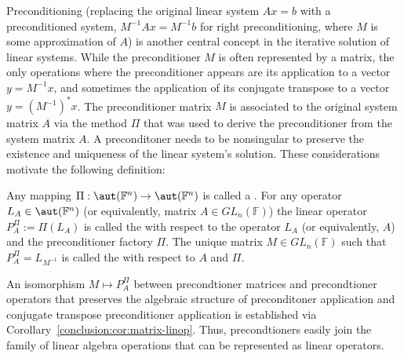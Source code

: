 Preconditioning (replacing the original linear system $Ax = b$ with a
preconditioned system, \eg $M^{-1}Ax = M^{-1}b$ for right preconditioning, where
$M$ is some approximation of $A$) is another central concept in the iterative
solution of linear systems. While the preconditioner $M$ is often
represented by a matrix, the only operations where the preconditioner appears
are its application to a vector $y = M^{-1}x$, and sometimes the application of
its conjugate transpose to a vector $y = (M^{-1})^*x$. The preconditioner matrix
$M$ is associated to the original system matrix $A$ via the method $\Pi$ that
was used to derive the preconditioner from the system matrix $A$. A
preconditoner needs to be nonsingular to preserve the existence and uniqueness
of the linear system's solution. These considerations motivate the following
definition:

\begin{definition}
\label{conclusion:def:precond-linop}
Any mapping $\Pi : \aut(\mathbb{F}^n) \rightarrow \aut(\mathbb{F}^n)$ is called
a . For any operator $L_A \in
\aut(\mathbb{F}^n)$ (or equivalently, matrix $A \in GL_n(\mathbb{F})$) the
linear operator $P_A^\Pi := \Pi(L_A)$ is called the  with respect to the operator $L_A$ (or equivalently, $A$) and the
preconditioner factory $\Pi$.  The unique matrix $M \in GL_n(\mathbb{F})$ such
that $P_A^\Pi = L_{M^{-1}}$ is called the  with
respect to $A$ and $\Pi$.
\end{definition}

An isomorphism $M \mapsto P_A^\Pi$ between precondtioner matrices and
precondtioner operators that preserves the algebraic structure of preconditoner
application and conjugate transpose preconditioner application is established
via Corollary~\ref{conclusion:cor:matrix-linop}. Thus, precondtioners easily
join the family of linear algebra operations that can be represented as linear
operators.

